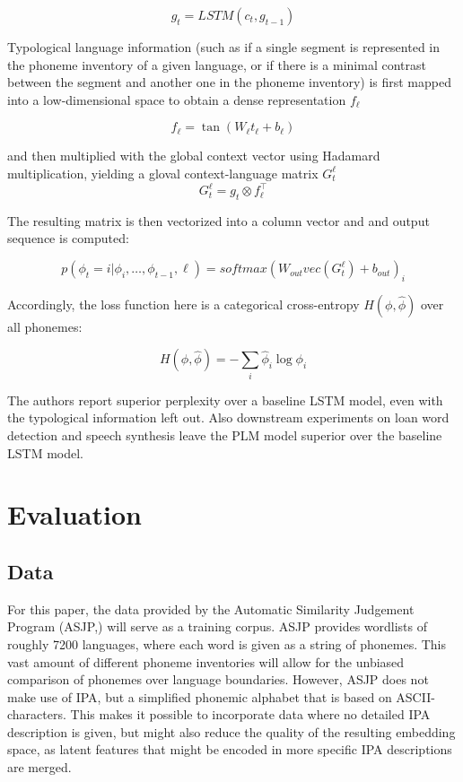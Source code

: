 \documentclass[11pt]{article}
\begin{document}
\begin{equation}
g_t = LSTM(c_t,g_{t-1}) 
\label{eq:plm_2}
\end{equation}

Typological language information (such as if a single segment is represented in the phoneme inventory of a given language, or if there is a minimal contrast between the segment and another one in the phoneme inventory) is first mapped into a low-dimensional space to obtain a dense representation $f_\ell$

\begin{equation}
f_\ell = \tan(W_\ell t_\ell + b_\ell) 
\label{eq:plm_3}
\end{equation}


and then multiplied with the global context vector using Hadamard multiplication, yielding a gloval context-language matrix $G_t^\ell$
\begin{equation}
G_t^\ell = g_t \otimes f_\ell^\top 
\label{eq:plm_4}
\end{equation}


The resulting matrix is then vectorized into a column vector and and output sequence is computed:

\begin{equation}
p(\phi_t = i | \phi_i,\ldots,\phi_{t-1},\ell) = softmax(W_{out}vec(G_t^\ell)+b_{out})_i 
\label{eq:plm_5}
\end{equation}

Accordingly, the loss function here is a categorical cross-entropy $H(\phi,\hat{\phi})$ over all phonemes:

\begin{equation}
H(\phi,\hat{\phi}) = - \sum_i \hat{\phi}_i \log \phi_i
\label{eq:plm_6}
\end{equation}

The authors report superior perplexity over a baseline LSTM model, even with the typological information left out. Also downstream experiments on loan word detection and  speech synthesis leave the PLM model superior over the baseline LSTM model.

\section{Evaluation}
\subsection{Data}
For this paper, the data provided by the Automatic Similarity Judgement Program (ASJP,) will serve as a training corpus. ASJP provides wordlists of roughly 7200 languages, where each word is given as a string of phonemes. This vast amount of different phoneme inventories will allow for the unbiased comparison of phonemes over language boundaries. However, ASJP does not make use of IPA, but a simplified phonemic alphabet that is based on ASCII-characters. This makes it possible to incorporate data where no detailed IPA description is given, but might also reduce the quality of the resulting embedding space, as latent features that might be encoded in more specific IPA descriptions are merged. 
\end{document}
